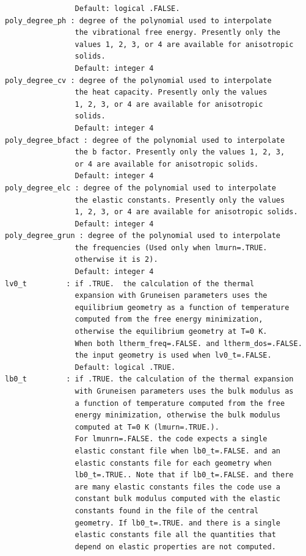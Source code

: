 \documentclass[12pt,a4paper,twoside]{report}
\begin{document}
\begin{verbatim}
                Default: logical .FALSE.
poly_degree_ph : degree of the polynomial used to interpolate 
                the vibrational free energy. Presently only the 
                values 1, 2, 3, or 4 are available for anisotropic 
                solids. 
                Default: integer 4
poly_degree_cv : degree of the polynomial used to interpolate 
                the heat capacity. Presently only the values 
                1, 2, 3, or 4 are available for anisotropic 
                solids.
                Default: integer 4
poly_degree_bfact : degree of the polynomial used to interpolate 
                the b factor. Presently only the values 1, 2, 3, 
                or 4 are available for anisotropic solids.
                Default: integer 4
poly_degree_elc : degree of the polynomial used to interpolate 
                the elastic constants. Presently only the values 
                1, 2, 3, or 4 are available for anisotropic solids.
                Default: integer 4
poly_degree_grun : degree of the polynomial used to interpolate 
                the frequencies (Used only when lmurn=.TRUE. 
                otherwise it is 2).
                Default: integer 4
lv0_t         : if .TRUE.  the calculation of the thermal 
                expansion with Gruneisen parameters uses the 
                equilibrium geometry as a function of temperature 
                computed from the free energy minimization, 
                otherwise the equilibrium geometry at T=0 K. 
                When both ltherm_freq=.FALSE. and ltherm_dos=.FALSE. 
                the input geometry is used when lv0_t=.FALSE.
                Default: logical .TRUE.
lb0_t         : if .TRUE. the calculation of the thermal expansion 
                with Gruneisen parameters uses the bulk modulus as 
                a function of temperature computed from the free 
                energy minimization, otherwise the bulk modulus 
                computed at T=0 K (lmurn=.TRUE.). 
                For lmunrn=.FALSE. the code expects a single 
                elastic constant file when lb0_t=.FALSE. and an 
                elastic constants file for each geometry when 
                lb0_t=.TRUE.. Note that if lb0_t=.FALSE. and there 
                are many elastic constants files the code use a 
                constant bulk modulus computed with the elastic 
                constants found in the file of the central 
                geometry. If lb0_t=.TRUE. and there is a single 
                elastic constants file all the quantities that 
                depend on elastic properties are not computed.

\end{verbatim}
\end{document}
